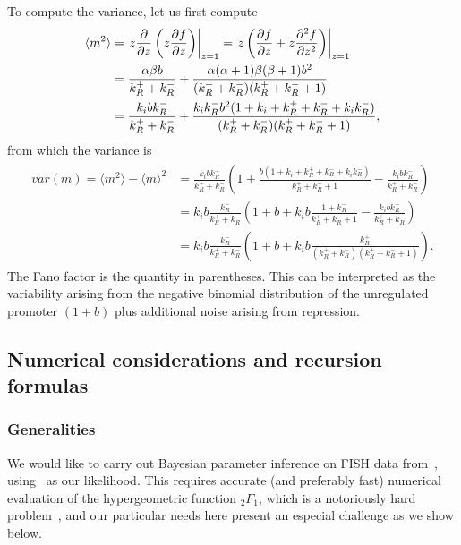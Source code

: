 To compute the variance, let us first compute
\begin{align}
\begin{split}
\langle m^2\rangle
&= \left .z\pderiv{z}\left(z\pderiv[f]{z}\right) \right|_{z=1}
= \left. z\left(\pderiv[f]{z} + z\psecderiv[f]{z}\right)\right|_{z=1}
\\
&= \frac{\alpha\beta b}{k_R^+ + k_R^-}
        + \frac{\alpha(\alpha+1)\beta(\beta+1) b^2}
                {(k_R^+ + k_R^-)(k_R^+ + k_R^- + 1)}
\\
&= \frac{k_i b k_R^-}{k_R^+ + k_R^-}
        + \frac{k_i k_R^- b^2 (1 + k_i + k_R^+ + k_R^- + k_i k_R^-)}
                {(k_R^+ + k_R^-)(k_R^+ + k_R^- + 1)},
\end{split}
\end{align}
from which the variance is
\begin{align}
\begin{split}
var(m) = \langle m^2\rangle - \langle m\rangle^2
&= \frac{k_i b k_R^-}{k_R^+ + k_R^-}
\left(
1 + \frac{b(1 + k_i + k_R^+ + k_R^- + k_i k_R^-)} {k_R^+ + k_R^- + 1}
- \frac{k_i b k_R^-}{k_R^+ + k_R^-}
\right)
\\
&= k_i b\frac{k_R^-}{k_R^+ + k_R^-}
\left(
1 + b + k_i b\frac{1 + k_R^-} {k_R^+ + k_R^- + 1}
- \frac{k_i b k_R^-}{k_R^+ + k_R^-}
\right)
\\
&= k_i b\frac{k_R^-}{k_R^+ + k_R^-}
\left(
1 + b + k_i b\frac{k_R^+}{(k_R^+ + k_R^-)(k_R^+ + k_R^- + 1)}
\right).
\end{split}
\end{align}
The Fano factor is the quantity in parentheses. This can be interpreted as
the variability arising from the negative binomial distribution of the
unregulated promoter $(1+b)$ plus additional noise arising from repression.


\subsection{Numerical considerations and recursion formulas}
\subsubsection{Generalities}
We would like to carry out Bayesian parameter inference on FISH data
from~\cite{Jones2014}, using~ as our
likelihood. This requires accurate (and preferably fast)
numerical evaluation of the hypergeometric function ${_2F_1}$,
which is a notoriously hard problem~\cite{Pearson2017, Gil2007},
and our particular needs here present an especial challenge as we show below.

